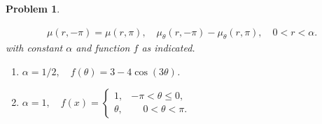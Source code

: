 \documentclass[letterpaper,11pt]{article} %
\theoremstyle{plain}
\newtheorem{problem}{Problem}
\begin{document}
\begin{problem}
\begin{enumerate}[label=\alph*.)]
{{\begin{gather*}
                \mu(r, -\pi) = \mu(r,\pi), \quad \mu_{\theta}(r, -\pi) - \mu_\theta(r, \pi), \quad 0 < r < \alpha.
                \end{gather*}
                with constant $\alpha$ and function $f$ as indicated.
                \begin{enumerate}[label=\#\arabic*.)]
                    \item $\alpha = 1/2, \quad f(\theta) = 3-4\cos(3\theta)$.
                    \addtocounter{enumii}{2} %
                    \item $\alpha =1, \quad f(x) = \begin{cases} 1, & -\pi < \theta \leq 0, \\ \theta, & \phantom{-}0 < \theta < \pi. \end{cases}$
                \end{enumerate}
        }}
    \end{enumerate}
\end{problem}
\end{document}
